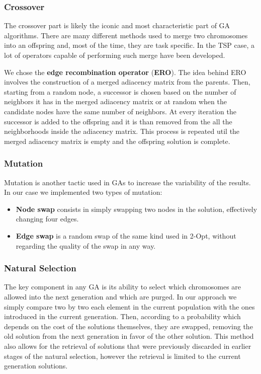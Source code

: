 \subsubsection{Crossover}

The crossover part is likely the iconic and most characteristic part of GA algorithms.
There are many different methods used to merge two chromosomes into an offspring and, most of the time, they are task specific.
In the TSP case, a lot of operators capable of performing such merge have been developed.

We chose the \textbf{edge recombination operator} (\textbf{ERO}).
The idea behind ERO involves the construction of a merged adiacency matrix from the parents.
Then, starting from a random node, a successor is chosen based on the number of neighbors it has in the merged adiacency matrix or at random when the candidate nodes have the same number of neighbors.
At every iteration the successor is added to the offspring and it is than removed from the all the neighborhoods inside the adiacency matrix.
This process is repeated util the merged adiacency matrix is empty and the offspring solution is complete.

\subsubsection{Mutation}

Mutation is another tactic used in GAs to increase the variability of the results.
In our case we implemented two types of mutation:
\begin{itemize}
    \item \textbf{Node swap} consists in simply swapping two nodes in the solution, effectively changing four edges.
    \item \textbf{Edge swap} is a random swap of the same kind used in 2-Opt, without regarding the quality of the swap in any way.
\end{itemize}

\subsubsection{Natural Selection}

The key component in any GA is its ability to select which chromosomes are allowed into the next generation and which are purged.
In our approach we simply compare two by two each element in the current population with the ones introduced in the current generation.
Then, according to a probability which depends on the cost of the solutions themselves, they are swapped, removing the old solution from the next generation in favor of the other solution. 
This method also allows for the retrieval of solutions that were previously discarded in earlier stages of the natural selection, however the retrieval is limited to the current generation solutions.

